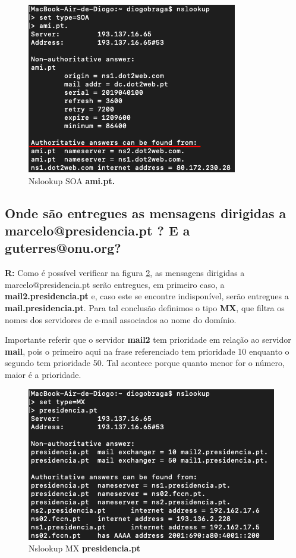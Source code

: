 \documentclass{llncs}
\begin{document}
\begin{figure}[H]
\begin{center}
\includegraphics[scale=0.6]{5_2.png}
\end{center}
\caption{\label{fig:522}Nslookup SOA \textbf{ami.pt.}}
\end{figure}

\subsection{\textbf{Onde são entregues as mensagens dirigidas a marcelo@presidencia.pt ? E a guterres@onu.org?}}
\textbf{R:} Como é possível verificar na figura \ref{fig:71}, as mensagens dirigidas a marcelo@presidencia.pt serão entregues, em primeiro caso, a \textbf{mail2.presidencia.pt} e, caso este se encontre indisponível, serão entregues a \textbf{mail.presidencia.pt}. Para tal conclusão definimos o tipo \textbf{MX}, que filtra os nomes dos servidores de e-mail associados ao nome do domínio.

Importante referir que o servidor \textbf{mail2} tem prioridade em relação ao servidor \textbf{mail}, pois o primeiro aqui na frase referenciado tem prioridade 10 enquanto o segundo tem prioridade 50. Tal acontece porque quanto menor for o número, maior é a prioridade.

\begin{figure}[H]
\begin{center}
\includegraphics[scale=0.6]{7_1.png}
\end{center}
\caption{\label{fig:71}Nslookup MX \textbf{presidencia.pt}}
\end{figure}
\end{document}
